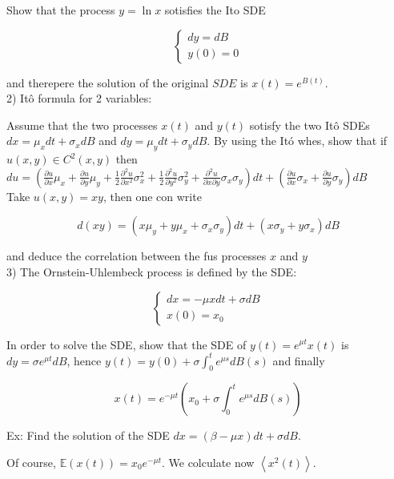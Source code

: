 \documentclass[10pt]{article}
\begin{document}
Show that the process $y=\ln x$ sotisfies the Ito SDE

$$
\left\{\begin{array}{l}
d y=d B \\
y(0)=0
\end{array}\right.
$$

and therepere the solution of the original $S D E$ is $x(t)=e^{B(t)}$.\\
2) Itô formula for 2 variables:

Assume that the two processes $x(t)$ and $y(t)$ sotisfy the two Itô SDEs $d x=\mu_{x} d t+\sigma_{x} d B$ and $d y=\mu_{y} d t+\sigma_{y} d B$. By using the Itó whes, show that if $u(x, y) \in C^{2}(x, y)$ then\\
$d u=\left(\frac{\partial u}{\partial x} \mu_{x}+\frac{\partial u}{\partial y} \mu_{y}+\frac{1}{2} \frac{\partial^{2} u}{\partial x^{2}} \sigma_{x}^{2}+\frac{1}{2} \frac{\partial^{2} u}{\partial y^{2}} \sigma_{y}^{2}+\frac{\partial^{2} u}{\partial x \partial y} \sigma_{x} \sigma_{y}\right) d t+\left(\frac{\partial u}{\partial x} \sigma_{x}+\frac{\partial u}{\partial y} \sigma_{y}\right) d B$\\
Take $u(x, y)=x y$, then one con write

$$
d(x y)=\left(x \mu_{y}+y \mu_{x}+\sigma_{x} \sigma_{y}\right) d t+\left(x \sigma_{y}+y \sigma_{x}\right) d B
$$

and deduce the correlation between the fus processes $x$ and $y$\\
3) The Ornstein-Uhlembeck process is defined by the SDE:

$$
\left\{\begin{array}{l}
d x=-\mu x d t+\sigma d B \\
x(0)=x_{0}
\end{array}\right.
$$

In order to solve the SDE, show that the SDE of $y(t)=e^{\mu t} x(t)$ is $d y=\sigma e^{\mu t} d B$, hence $y(t)=y(0)+\sigma \int_{0}^{t} e^{\mu s} d B(s)$ and finally


\begin{equation*}
x(t)=e^{-\mu t}\left(x_{0}+\sigma \int_{0}^{t} e^{\mu s} d B(s)\right) \tag{36}
\end{equation*}


Ex: Find the solution of the SDE $d x=(\beta-\mu x) d t+\sigma d B$.

Of course, $\mathbb{E}(x(t))=x_{0} e^{-\mu t}$. We colculate now $\left\langle x^{2}(t)\right\rangle$.
\end{document}
